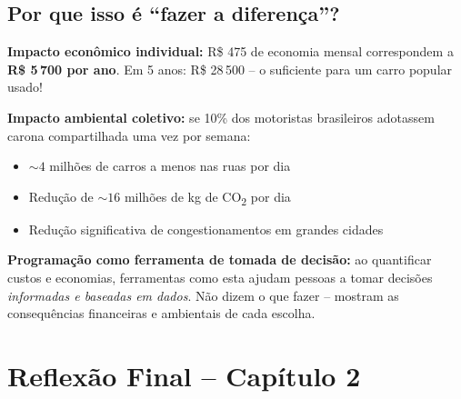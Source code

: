 \documentclass[12pt,a4paper]{article}
\begin{document}
\subsection*{Por que isso é ``fazer a diferença''?}

\begin{tcolorbox}[colback=ecolightgreen,colframe=ecogreen,
  title={\bfseries Pequenas economias, grande impacto}]

\textbf{Impacto econômico individual:} R\$ 475 de economia mensal correspondem
a \textbf{R\$ 5\,700 por ano}. Em 5 anos: R\$ 28\,500 -- o suficiente para um
carro popular usado!

\textbf{Impacto ambiental coletivo:} se 10\% dos motoristas brasileiros adotassem
carona compartilhada uma vez por semana:
\begin{itemize}[noitemsep]
  \item $\sim 4$ milhões de carros a menos nas ruas por dia
  \item Redução de $\sim 16$ milhões de kg de CO\textsubscript{2} por dia
  \item Redução significativa de congestionamentos em grandes cidades
\end{itemize}

\textbf{Programação como ferramenta de tomada de decisão:} ao quantificar custos
e economias, ferramentas como esta ajudam pessoas a tomar decisões \textit{informadas
e baseadas em dados}. Não dizem o que fazer -- mostram as consequências
financeiras e ambientais de cada escolha.
\end{tcolorbox}

\newpage

\section*{Reflexão Final -- Capítulo 2}
\end{document}

